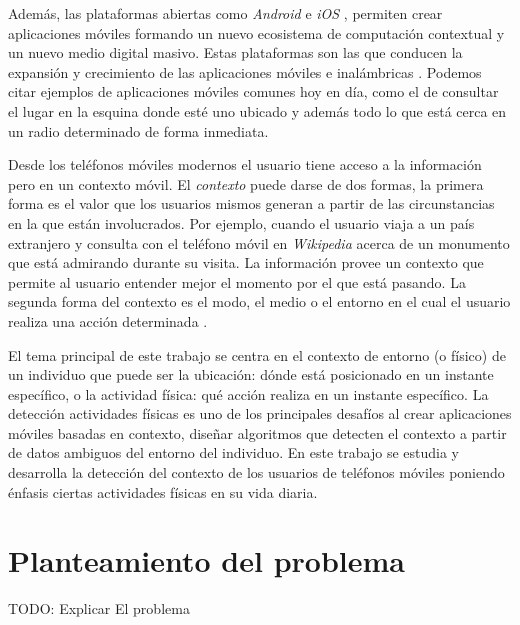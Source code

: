 Además, las plataformas abiertas como \emph{Android} \cite{google2005and}
e\emph{ iOS} \cite{apple2007ios},
permiten crear aplicaciones móviles formando un nuevo ecosistema de
computación contextual y un nuevo medio digital masivo. Estas plataformas
son las que conducen la expansión y crecimiento de las aplicaciones
móviles e inalámbricas \cite{Tanenbaum2010}. Podemos citar ejemplos
de aplicaciones móviles comunes hoy en día, como el de consultar el
lugar en la esquina donde esté uno ubicado y además todo lo que está
cerca en un radio determinado de forma inmediata. 

Desde los teléfonos móviles modernos el usuario tiene acceso a la
información pero en un contexto móvil. El \emph{contexto} puede darse
de dos formas, la primera forma es el valor que los usuarios mismos
generan a partir de las circunstancias en la que están involucrados.
Por ejemplo, cuando el usuario viaja a un país extranjero y consulta
con el teléfono móvil en \emph{Wikipedia} 
acerca de un monumento que está admirando durante su visita. La información
provee un contexto que permite al usuario entender mejor el momento
por el que está pasando. La segunda forma del contexto es el modo,
el medio o el entorno en el cual el usuario realiza una acción determinada
\cite{fling2009mobile}. 

El tema principal de este trabajo se centra en el contexto de entorno
(o físico) de un individuo que puede ser la ubicación: dónde está
posicionado en un instante específico, o la actividad física: qué
acción realiza en un instante específico. La detección actividades
físicas es uno de los principales desafíos al crear aplicaciones móviles
basadas en contexto, diseñar algoritmos que detecten el contexto a
partir de datos ambiguos del entorno del individuo\cite{Bao2004}.
En este trabajo se estudia y desarrolla la detección del contexto
de los usuarios de teléfonos móviles poniendo énfasis ciertas actividades
físicas en su vida diaria.

\section{Planteamiento del problema\label{planteamiento}}

TODO: Explicar El problema

